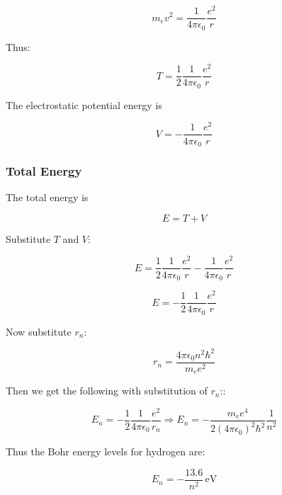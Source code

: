 \documentclass[
	a4paper,
	parskip=half,
    pagesize=auto,      		%
    listof=totoc,   		%
    bibliography=totoc,
	11pt
]{scrartcl}
\begin{document}
\begin{equation}
	m_e v^2
	=
	\frac{1}{4\pi\epsilon_0}\frac{e^2}{r}
\end{equation}

Thus:

\begin{equation}
	T
	=
	\frac{1}{2}
	\frac{1}{4\pi\epsilon_0}
	\frac{e^2}{r}
\end{equation}

The electrostatic potential energy is

\begin{equation}
	V
	=
	-
	\frac{1}{4\pi\epsilon_0}
	\frac{e^2}{r}
\end{equation}

\subsubsection*{Total Energy}

The total energy is

\begin{equation}
	E = T + V
\end{equation}

Substitute $T$ and $V$:

\begin{equation}
	E
	=
	\frac{1}{2}
	\frac{1}{4\pi\epsilon_0}
	\frac{e^2}{r}
	-
	\frac{1}{4\pi\epsilon_0}
	\frac{e^2}{r}
\end{equation}

\begin{equation}
	E
	=
	-
	\frac{1}{2}
	\frac{1}{4\pi\epsilon_0}
	\frac{e^2}{r}
\end{equation}

Now substitute $r_n$:

\begin{equation}
	r_n
	=
	\frac{4\pi\epsilon_0 n^2 \hbar^2}{m_e e^2}
\end{equation}

Then we get the following with substitution of $r_n$::

\begin{equation}
	E_n
	=
	-
	\frac{1}{2}
	\frac{1}{4\pi\epsilon_0}
	\frac{e^2}{r_n}
	\Rightarrow E_n = - \frac{m_e e^4}{2(4\pi\epsilon_0)^2 \hbar^2}\frac{1}{n^2}
\end{equation}

Thus the Bohr energy levels for hydrogen are:

\begin{equation}
	E_n
	=
	-
	\frac{13.6}{n^2}\,\mathrm{eV}
\end{equation}
\end{document}
